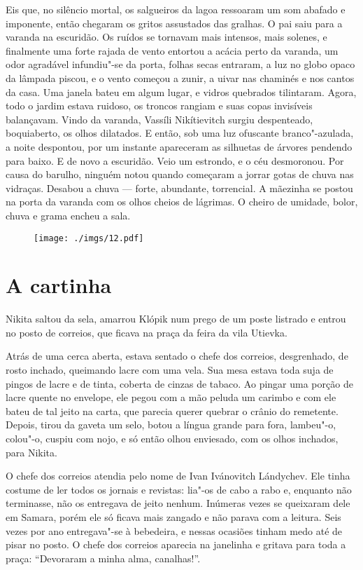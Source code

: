 Eis que, no silêncio mortal, os salgueiros da lagoa ressoaram um som
abafado e imponente, então chegaram os gritos assustados das gralhas. O
pai saiu para a varanda na escuridão. Os ruídos se tornavam mais
intensos, mais solenes, e finalmente uma forte rajada de vento entortou
a acácia perto da varanda, um odor agradável infundiu"-se da porta,
folhas secas entraram, a luz no globo opaco da lâmpada piscou, e o vento
começou a zunir, a uivar nas chaminés e nos cantos da casa. Uma janela
bateu em algum lugar, e vidros quebrados tilintaram. Agora, todo o
jardim estava ruidoso, os troncos rangiam e suas copas invisíveis
balançavam. Vindo da varanda, Vassíli Nikítievitch surgiu despenteado,
boquiaberto, os olhos dilatados. E então, sob uma luz ofuscante
branco"-azulada, a noite despontou, por um instante apareceram as
silhuetas de árvores pendendo para baixo. E de novo a escuridão. Veio um
estrondo, e o céu desmoronou. Por causa do barulho, ninguém notou quando
começaram a jorrar gotas de chuva nas vidraças. Desabou a chuva ---
forte, abundante, torrencial. A mãezinha se postou na porta da varanda
com os olhos cheios de lágrimas. O cheiro de umidade, bolor,
chuva e grama encheu a sala.

\begin{figure}
\vspace*{-2.1cm}
\hspace*{-2.5cm}\texttt{[image: ./imgs/12.pdf]}
\end{figure}

\chapter{A cartinha}

Nikita saltou da sela, amarrou Klópik num prego de um poste listrado e
entrou no posto de correios, que ficava na praça da feira da vila
Utievka.

Atrás de uma cerca aberta, estava sentado o chefe dos correios,
desgrenhado, de rosto inchado, queimando lacre com uma vela. Sua mesa
estava toda suja de pingos de lacre e de tinta, coberta de cinzas de
tabaco. Ao pingar uma porção de lacre quente no envelope, ele pegou com
a mão peluda um carimbo e com ele bateu de tal jeito na carta, que
parecia querer quebrar o crânio do remetente. Depois, tirou da gaveta um
selo, botou a língua grande para fora, lambeu"-o, colou"-o, cuspiu com
nojo, e só então olhou enviesado, com os olhos inchados, para Nikita.

O chefe dos correios atendia pelo nome de Ivan Ivánovitch Lándychev. Ele
tinha costume de ler todos os jornais e revistas: lia"-os de cabo a rabo
e, enquanto não terminasse, não os entregava de jeito nenhum. Inúmeras
vezes se queixaram dele em Samara, porém ele só ficava mais zangado e
não parava com a leitura. Seis vezes por ano entregava"-se à bebedeira,
e nessas ocasiões tinham medo até de pisar no posto. O chefe dos
correios aparecia na janelinha e gritava para toda a praça: ``Devoraram
a minha alma, canalhas!''.


